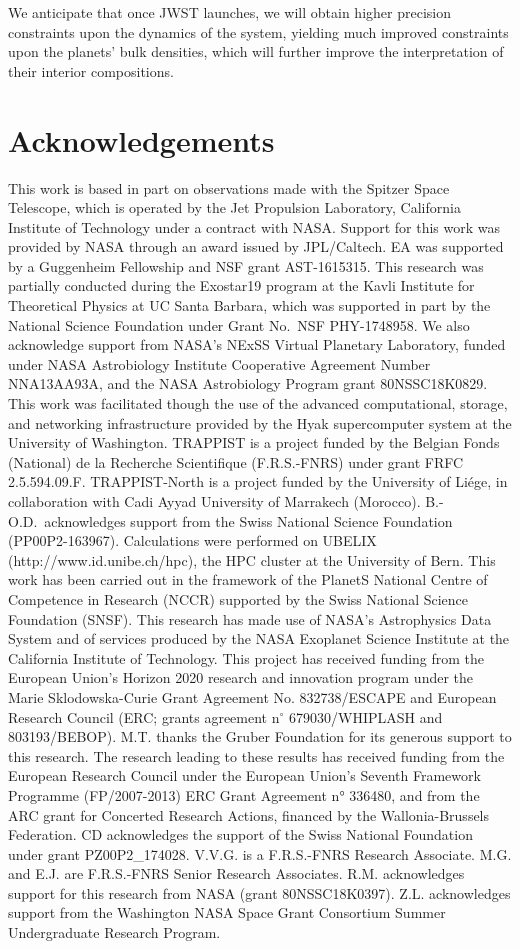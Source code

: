 \documentclass[twocolumn]{aastex63}
\begin{document}
We anticipate that once JWST launches, we will obtain higher precision constraints upon the dynamics of the system, yielding much improved constraints upon the planets' bulk densities, which will further improve the interpretation of their interior compositions.

\section*{Acknowledgements}

This work is based in part on observations made with the Spitzer Space Telescope, which
is operated by the Jet Propulsion Laboratory, California Institute of Technology under
a contract with NASA. Support for this work was provided by NASA through an award issued
by JPL/Caltech.  EA was supported by a Guggenheim Fellowship and NSF grant AST-1615315.
This research was partially conducted during the Exostar19 program at the Kavli Institute 
for Theoretical Physics at UC Santa Barbara, which was supported in part by the National
Science Foundation under Grant No.\ NSF PHY-1748958.
We also acknowledge support from NASA's NExSS Virtual Planetary Laboratory, funded under
NASA Astrobiology Institute Cooperative Agreement Number NNA13AA93A, and the NASA Astrobiology
Program grant 80NSSC18K0829.
This work was facilitated though the use of the advanced computational, storage, and
networking infrastructure provided by the Hyak supercomputer system at the University of
Washington. TRAPPIST is a project funded by the Belgian Fonds (National) de la Recherche 
Scientifique (F.R.S.-FNRS) under grant FRFC 2.5.594.09.F. TRAPPIST-North is a project funded 
by the University of Li\'ege, in collaboration with Cadi Ayyad University of Marrakech (Morocco).
B.-O.D.\ acknowledges support from the Swiss National Science Foundation (PP00P2-163967).
Calculations were performed on UBELIX (http://www.id.unibe.ch/hpc), the HPC
cluster at the University of Bern. This work has been carried out in the framework of the PlanetS National Centre
of Competence in Research (NCCR) supported by the Swiss National Science Foundation (SNSF).
This research has made use of NASA's Astrophysics Data System and of services produced by
the NASA Exoplanet Science Institute at the California Institute of Technology.
This project has received funding from the European Union's Horizon 2020 research and
innovation program under the Marie Sklodowska-Curie Grant Agreement No. 832738/ESCAPE and European Research Council (ERC; grants agreement n$^\circ$ 679030/WHIPLASH and 803193/BEBOP). M.T.
thanks the Gruber Foundation for its generous support to this research.
The research leading to these results has received funding from the European Research Council
under the European Union's Seventh Framework Programme (FP/2007-2013) ERC Grant
Agreement n° 336480, and from the ARC grant for Concerted Research Actions, financed by the
Wallonia-Brussels Federation. CD acknowledges the support of the Swiss National Foundation under grant PZ00P2\_174028. V.V.G. is a F.R.S.-FNRS Research Associate. M.G. and E.J. are F.R.S.-FNRS Senior Research Associates. R.M. acknowledges support for this research from NASA (grant 80NSSC18K0397). Z.L. acknowledges support from the Washington NASA Space Grant Consortium Summer Undergraduate Research Program.
\end{document}

